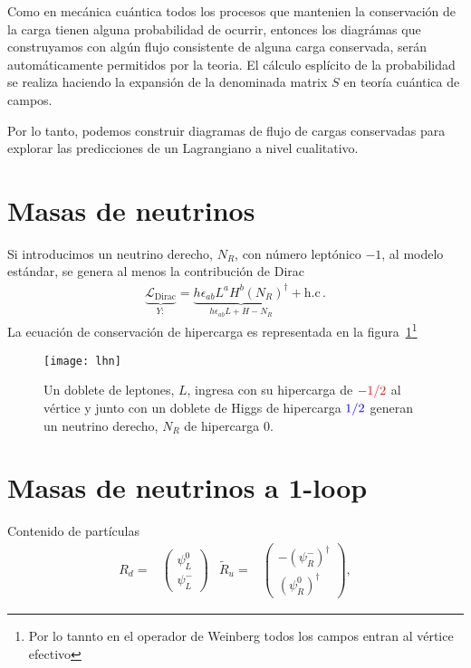 Como en mecánica cuántica todos los procesos que mantenien la conservación de la carga tienen alguna probabilidad de ocurrir, entonces los diagrámas que construyamos con algún flujo consistente de alguna carga conservada, serán automáticamente permitidos por la teoria. El cálculo esplícito de la probabilidad se realiza haciendo la expansión de la denominada matrix $S$ en teoría cuántica de campos.

Por lo tanto, podemos construir diagramas de flujo de cargas conservadas para explorar las predicciones de un Lagrangiano  a nivel cualitativo. 

\section{Masas de neutrinos}
Si introducimos un neutrino derecho, $N_R$, con número leptónico $-1$,  al  modelo estándar, se genera al menos la contribución de Dirac
\begin{align}
  \underbrace{\mathcal{L}_{\text{Dirac}}}_{\displaystyle Y:}=
  \underbrace{h  \epsilon_{ab} L^{a} H^{b} \left( N_R \right)^{\dagger}}_{\displaystyle h  \epsilon_{ab} L+H -N_R } +\text{h.c}\,. 
\end{align}
La ecuación de conservación de hipercarga es representada en la figura~\ref{fig:dnu}\footnote{Por lo tannto en el operador de Weinberg todos los campos entran al vértice efectivo}

\begin{figure}
  \centering
  \texttt{[image: lhn]}
  \caption{Un doblete de leptones, $L$, ingresa con su hipercarga de $-\color{red}1/2$ al vértice  y junto con un doblete de Higgs de hipercarga $\color{blue}1/2$ generan un  neutrino derecho, $N_R$ de hipercarga $0$. }
  \label{fig:dnu}
\end{figure}



\section{Masas de neutrinos a 1-loop}
Contenido de partículas
  \begin{align*}
  R_{d}=&
  \begin{pmatrix}
    \psi_{L}^{0}\\
    \psi_{L}^{-}
  \end{pmatrix}
&  
\widetilde{R}_{u}=&
  \begin{pmatrix}
   - \left( \psi_{R}^{-} \right)^{\dagger}\\
     \left(\psi_{R}^{0}\right)^{\dagger}
  \end{pmatrix},
\end{align*}



